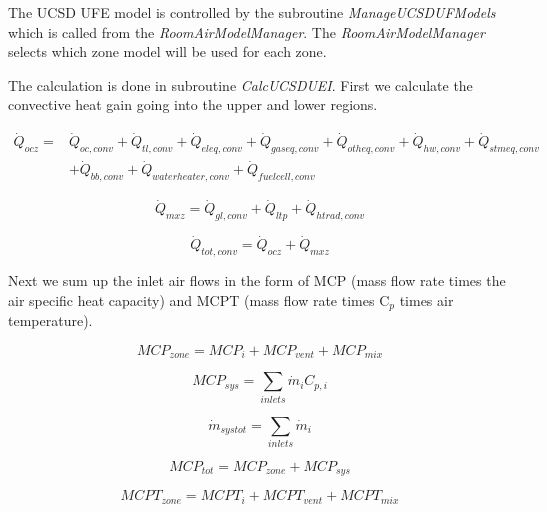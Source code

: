 The UCSD UFE model is controlled by the subroutine \emph{ManageUCSDUFModels} which is called from the \emph{RoomAirModelManager}. The \emph{RoomAirModelManager} selects which zone model will be used for each zone.

The calculation is done in subroutine \emph{CalcUCSDUEI}. First we calculate the convective heat gain going into the upper and lower regions.

\begin{equation}
\begin{split}
\dot Q_{ocz} =& \dot Q_{oc,conv} + \dot Q_{tl,conv} + \dot Q_{eleq,conv} + \dot Q_{gaseq,conv} + \dot Q_{otheq,conv} + \dot Q_{hw,conv} + \dot Q_{stmeq,conv} \\
&+ \dot Q_{bb,conv} + \dot Q_{waterheater,conv} + \dot Q_{fuelcell,conv}
\end{split}
\end{equation}

\begin{equation}
{\dot Q_{mxz}} = {\dot Q_{gl,conv}} + {\dot Q_{ltp}} + {\dot Q_{htrad,conv}}
\end{equation}

\begin{equation}
{\dot Q_{tot,conv}} = {\dot Q_{ocz}} + {\dot Q_{mxz}}
\end{equation}

Next we sum up the inlet air flows in the form of MCP (mass flow rate times the air specific heat capacity) and MCPT (mass flow rate times C\(_{p}\) times air temperature).

\begin{equation}
MC{P_{zone}} = MC{P_i} + MC{P_{vent}} + MC{P_{mix}}
\end{equation}

\begin{equation}
MC{P_{sys}} = \sum\limits_{inlets} {{{\dot m}_i}} {C_{p,i}}
\end{equation}

\begin{equation}
{\dot m_{systot}} = \sum\limits_{inlets} {{{\dot m}_i}}
\end{equation}

\begin{equation}
MC{P_{tot}} = MC{P_{zone}} + MC{P_{sys}}
\end{equation}

\begin{equation}
MCP{T_{zone}} = MCP{T_i} + MCP{T_{vent}} + MCP{T_{mix}}
\end{equation}

